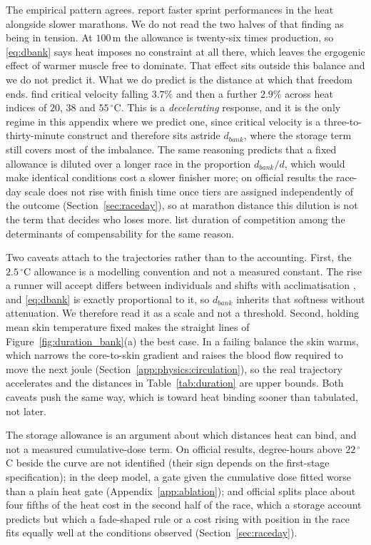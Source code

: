 The empirical pattern agrees. \citet{guy2014} report faster sprint performances
in the heat alongside slower marathons. We do not read the two halves of that
finding as being in tension. At $100\,\mathrm{m}$ the allowance is twenty-six
times production, so \eqref{eq:dbank} says heat imposes no constraint at all
there, which leaves the ergogenic effect of warmer muscle free to dominate. That
effect sits outside this balance and we do not predict it. What we do predict is
the distance at which that freedom ends. \citet{leslie2024} find critical
velocity falling $3.7\%$ and then a further $2.9\%$ across heat indices of $20$,
$38$ and $55\,^{\circ}$C. This is a \emph{decelerating} response, and it is the
only regime in this appendix where we predict one, since critical velocity is a
three-to-thirty-minute construct and therefore sits astride $d_{bank}$, where
the storage term still covers most of the imbalance. The same reasoning predicts that a fixed allowance is diluted over a longer race in the
proportion $d_{bank}/d$, which would make identical conditions cost a slower
finisher more; on official results the race-day scale does not rise with finish
time once tiers are assigned independently of the outcome (Section~\ref{sec:raceday}),
so at marathon distance this dilution is not the term that decides who loses more. \citet{taylor2006} list
duration of competition among the determinants of compensability for the same
reason.

Two caveats attach to the trajectories rather than to the accounting. First, the
$2.5\,^{\circ}$C allowance is a modelling convention and not a measured
constant. The rise a runner will accept differs between individuals and shifts
with acclimatisation \citep{periard2015}, and \eqref{eq:dbank} is exactly
proportional to it, so $d_{bank}$ inherits that softness without attenuation. We
therefore read it as a scale and not a threshold. Second, holding mean skin
temperature fixed makes
the straight lines of Figure~\ref{fig:duration_bank}(a) the best case. In a
failing balance the skin warms, which narrows the core-to-skin gradient and
raises the blood flow required to move the next joule
(Section~\ref{app:physics:circulation}), so the real trajectory accelerates and
the distances in Table~\ref{tab:duration} are upper bounds. Both caveats push
the same way, which is toward heat binding sooner than tabulated, not later.

The storage allowance is an argument about which distances heat can bind, and
not a measured cumulative-dose term. On official results, degree-hours above
$22\,^{\circ}$C beside the curve are not identified (their sign depends on the
first-stage specification); in the deep model, a gate given the cumulative dose
fitted worse than a plain heat gate (Appendix~\ref{app:ablation}); and official
splits place about four fifths of the heat cost in the second half of the race,
which a storage account predicts but which a fade-shaped rule or a cost rising
with position in the race fits equally well at the conditions observed
(Section~\ref{sec:raceday}).

